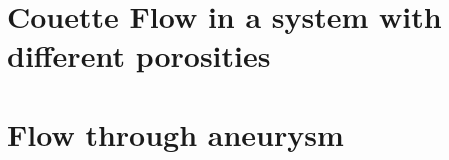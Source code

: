 \documentclass[a4paper, 11pt]{report}
\begin{document}
\section{Couette Flow in a system with different porosities} \label{sec:B.2}
{\footnotesize

}
\section{Flow through aneurysm} \label{sec:B.3}
{\footnotesize

}

\printbibliography[
heading=bibintoc,
title={Bibliography}
]
\end{document}
